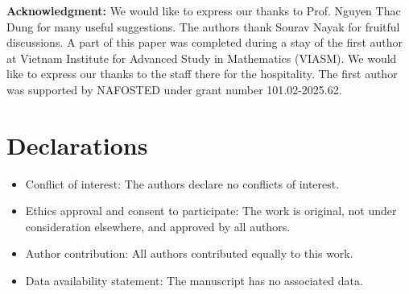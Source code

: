 \documentclass[leqno,12pt]{article} %
\theoremstyle{plain} %
\theoremstyle{definition} %
\numberwithin{equation}{section}
\begin{document}
	\vskip0.1cm
\noindent
{\bf Acknowledgment:}   We would like to express our thanks to Prof. Nguyen Thac Dung for many useful suggestions. The authors thank Sourav Nayak for fruitful discussions. A part of this paper was completed during a stay of the first
author  at Vietnam Institute for Advanced Study in Mathematics (VIASM). We would like to express our thanks to the staff there for the hospitality. The first author  was supported by NAFOSTED under grant number 101.02-2025.62.

\section*{\vskip-10mm\noindent Declarations}

\begin{itemize}

\item\vskip-1.5mm {Conflict of interest:} The authors declare no conflicts of interest.

\item\vskip-1.5mm {Ethics approval and consent to participate:} The work is original, not under consideration elsewhere, and approved by all authors.

\item\vskip-1.5mm {Author contribution:} All authors contributed equally to this work.

\item\vskip-1.5mm {Data availability statement:}
The manuscript has no associated data.
\end{itemize}
	
\end{document}
